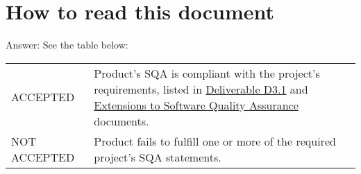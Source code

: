 
\appendix

\section{How to read this document}

\begin{description}[style=nextline]
\item[What are the \texttt{SQA Progress Status} possible values?] Answer: See the table below: \\[1em]
	\begin{tabular}{l L{10cm}}
		ACCEPTED & Product's SQA is compliant with the project's requirements, listed in \href{https://owncloud.indigo-datacloud.eu/index.php/s/yDklCrWjKnjutVA}{Deliverable D3.1} and \href{https://project.indigo-datacloud.eu/projects/wp3/wiki/Extensions_to_SQA}{Extensions to Software Quality Assurance} documents. \\
		NOT ACCEPTED & Product fails to fulfill one or more of the required project's SQA statements.
	\end{tabular}
\end{description}
